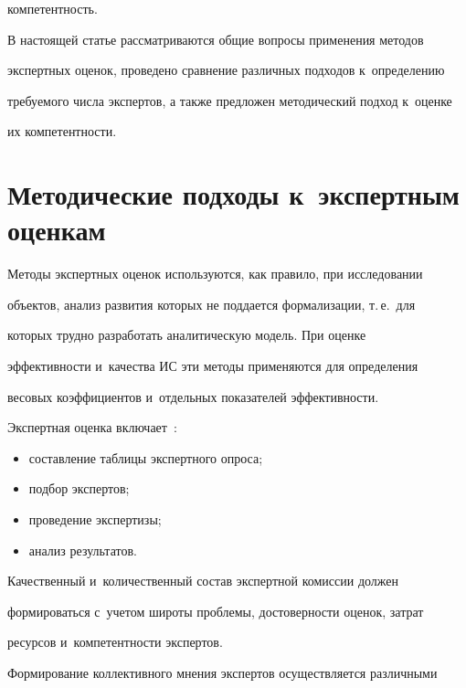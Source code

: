 компетентность.

  

  В настоящей статье рассматриваются общие вопросы применения методов 

экспертных оценок, проведено сравнение различных подходов к~определению 

требуемого числа экспертов, а также предложен методический подход к~оценке 

их компетентности.

  

\section{Методические подходы к~экспертным оценкам}

  

  Методы экспертных оценок используются, как правило, при исследовании 

объектов, анализ развития которых не поддается формализации, т.\,е.\ для 

которых трудно разработать аналитическую модель. При оценке 

эффективности и~качества ИС эти методы применяются для определения 

весовых коэффициентов и~отдельных показателей эффективности.

  

  Экспертная оценка включает~\cite{8-zac}:

  \begin{itemize}

\item составление таблицы экспертного опроса;

  \item подбор экспертов;

  \item проведение экспертизы; 

  \item анализ результатов.

  \end{itemize}

  

  Качественный и~количественный состав экспертной комиссии должен 

формироваться с~учетом широты проблемы, достоверности оценок, затрат 

ресурсов и~компетентности экспертов. 

  

  Формирование коллективного мнения экспертов осуществляется различными 

